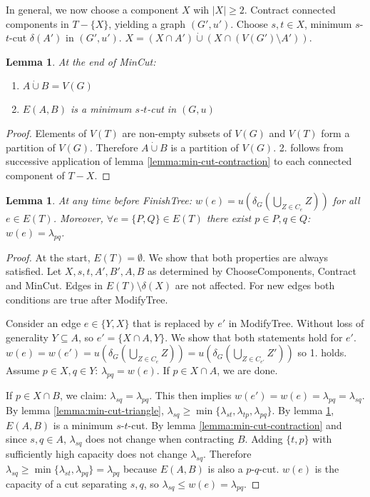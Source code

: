 \documentclass[11pt, a4paper]{article}
\newcommand{\abs}[1]{\left\lvert#1\right\rvert}
\newcommand{\set}[1]{\{#1\}}
\newtheorem{lemma}[theorem]{Lemma}
\theoremstyle{remark}
\theoremstyle{definition}
\begin{document}
In general, we now choose a component $X$ wih $\abs{X}\geq2$.
Contract connected components in $T-\set{X}$, yielding a graph
$(G',u')$. Choose $s,t\in X$, minimum $s$-$t$-cut $\delta(A')$ in
$(G',u')$. $X= (X\cap A')\dot\cup (X\cap (V(G')\setminus A'))$.

\begin{lemma}\label{lemma:min-cut-algorithm}
	At the end of MinCut:
	\begin{enumerate}
		\item $A\dot\cup B=V(G)$
		\item $E(A,B)$ is a minimum $s$-$t$-cut in $(G,u)$
	\end{enumerate}
\end{lemma}
\begin{proof}
	Elements of $V(T)$ are non-empty subsets of $V(G)$ and $V(T)$ form a
	partition of $V(G)$. Therefore $A\dot\cup B$ is a partition of $V(G)$.
	2. follows from successive application of lemma \ref{lemma:min-cut-contraction}
	to each connected component of $T-X$.
\end{proof}

\begin{lemma}\label{lemma:gomory-hu-alg-correct}
	At any time before FinishTree: $w(e)=u(\delta_G(\bigcup_{Z\in C_e}Z))$
	for all $e\in E(T)$. Moreover, $\forall e=\set{P,Q}\in E(T)$ there exist
	$p\in P, q\in Q$: $w(e)=\lambda_{pq}$.
\end{lemma}
\begin{proof}
	At the start, $E(T)=\emptyset$. We show that both properties are always
	satisfied. Let $X,s,t,A',B',A,B$ as determined by ChooseComponents,
	Contract and MinCut. Edges in $E(T)\setminus\delta(X)$ are not affected.
	For new edges both conditions are true after ModifyTree.

	Consider an edge $e\in \set{Y,X}$ that is replaced by $e'$ in
	ModifyTree. Without loss of generality $Y\subseteq A$, so
	$e'=\set{X\cap A,Y}$. We show that both statements hold for $e'$.
	$w(e)=w(e')= u(\delta_G(\bigcup_{Z\in
			C_e}Z))=u(\delta_G(\bigcup_{Z\in C_{e'}}Z'))$ so 1. holds. Assume
	$p\in X,q\in Y$: $\lambda_{pq}=w(e)$. If $p\in X\cap A$, we are done.

	If $p\in X\cap B$, we claim: $\lambda_{sq}=\lambda_{pq}$. This then
	implies $w(e')=w(e)=\lambda_{pq}=\lambda_{sq}$. By lemma
	\ref{lemma:min-cut-triangle},
	$\lambda_{sq}\geq\min\set{\lambda_{st},\lambda_{tp},\lambda_{pq}}$.
	By lemma \ref{lemma:min-cut-algorithm}, $E(A,B)$ is a minimum
	$s$-$t$-cut. By lemma \ref{lemma:min-cut-contraction} and since
	$s,q\in A$, $\lambda_{sq}$ does not change when contracting $B$.
	Adding $\set{t,p}$ with sufficiently high capacity does not change
	$\lambda_{sq}$. Therefore $\lambda_{sq}\geq
		\min\set{\lambda_{st},\lambda_{pq}}=\lambda_{pq}$ because $E(A,B)$ is
	also a $p$-$q$-cut. $w(e)$ is the capacity of a cut separating $s,q$,
	so $\lambda_{sq}\leq w(e)=\lambda_{pq}$.
\end{proof}
\end{document}
